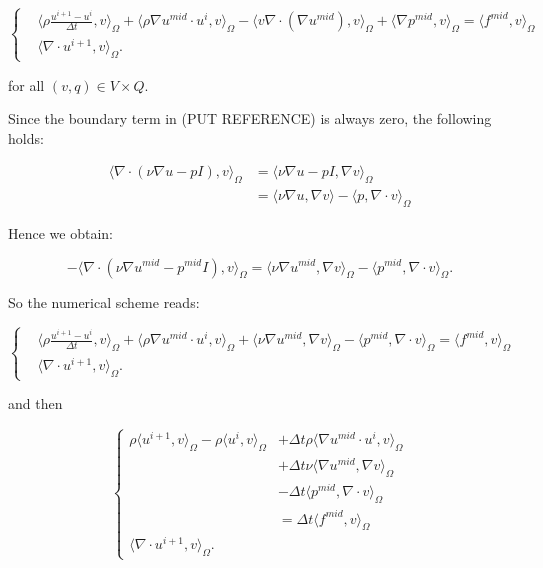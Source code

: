 \documentclass[11pt,a4paper,titlepage]{report}
\begin{document}
\[
\left\{  
\begin{aligned}
& \langle \rho \frac{u^{i+1} - u^i}{\Delta t},v \rangle_\Omega
+ \langle \rho \nabla u^{mid} \cdot u^i  ,v \rangle_\Omega
- \langle v \nabla \cdot (\nabla u^{mid}) ,v \rangle_\Omega
+ \langle \nabla p^{mid} ,v \rangle_\Omega = \langle f^{mid} ,v \rangle_\Omega \\
& \langle \nabla \cdot u^{i+1},v \rangle_\Omega.
\end{aligned}
\right.
\]

for all $(v,q) \in V \times Q$.

Since the boundary term in (PUT REFERENCE) is always zero, the following holds:

\[
\begin{aligned}
\langle \nabla \cdot (\nu \nabla u - pI) ,v \rangle_\Omega & = \langle \nu \nabla u - pI ,\nabla v \rangle_\Omega \\
														& = \langle \nu \nabla u  ,\nabla v \rangle  - \langle p ,\nabla \cdot v \rangle_\Omega										
\end{aligned}
\]

Hence we obtain:

\[
- \langle \nabla \cdot (\nu \nabla u^{mid} - p^{mid}I) ,v \rangle_{\Omega} = \langle \nu \nabla u^{mid}, \nabla v \rangle_\Omega -  \langle p^{mid}, \nabla \cdot v \rangle_\Omega.
\]

So the numerical scheme reads:

\[
\left\{  
\begin{aligned}
& \langle \rho \frac{u^{i+1} - u^i}{\Delta t},v \rangle_\Omega
+ \langle \rho \nabla u^{mid} \cdot u^i  ,v \rangle_\Omega
+ \langle \nu \nabla u^{mid}, \nabla v \rangle_\Omega
- \langle p^{mid} , \nabla \cdot v \rangle_\Omega = \langle f^{mid} ,v \rangle_\Omega \\
& \langle \nabla \cdot u^{i+1},v \rangle_\Omega.
\end{aligned}
\right.
\]

and then

\[
\left\{  
\begin{aligned}
\rho \langle u^{i+1},v \rangle_\Omega - \rho \langle u^i, v \rangle_\Omega & + \Delta t \rho \langle \nabla u^{mid} \cdot u^i  ,v \rangle_\Omega \\
& + \Delta t \nu \langle \nabla u^{mid}, \nabla v \rangle_\Omega \\
& - \Delta t \langle p^{mid} , \nabla \cdot v \rangle_\Omega \\
& = \Delta t \langle f^{mid} ,v \rangle_\Omega \\
\langle \nabla \cdot u^{i+1},v \rangle_\Omega.
\end{aligned}
\right.
\]
\end{document}
